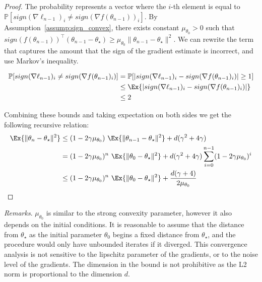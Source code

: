 \documentclass[12pt]{article}
\begin{document}
\begin{proof}
The probability represents a vector where the $i$-th element is equal to $\mathbb{P} [ sign( \nabla \ell_{n-1} )_i \neq sign( \nabla f ( \theta_{n-1} ) )_i ]$.
By Assumption~\ref{assump:sign_convex}, there exists constant $\mu_{\theta_0} > 0$ such that $sign( f ( \theta_{n-1} ) )^\top ( \theta_{n-1} - \theta_\star ) \geq \mu_{\theta_0} \| \theta_{n-1} - \theta_\star \|^2 $.
We can rewrite the term that captures the amount that the sign of the gradient estimate is incorrect, and use Markov's inequality.

\begin{align*}
\mathbb{P} [ sign( \nabla \ell_{n-1} )_i \neq sign( \nabla f ( \theta_{n-1} )_i ) ] &= \mathbb{P} [ | sign( \nabla \ell_{n-1} )_i - sign( \nabla f ( \theta_{n-1} )_i ) | \geq 1 ] \\
&\leq \Ex{ | sign( \nabla \ell_{n-1} )_i - sign( \nabla f ( \theta_{n-1} )_i ) | } \\
&\leq 2
\end{align*}

Combining these bounds and taking expectation on both sides we get the following recursive relation:
\begin{align*}
\Ex{ \| \theta_n - \theta_\star \|^2 } &\leq ( 1 - 2 \gamma \mu_{\theta_0} ) \ \Ex{ \| \theta_{n-1} - \theta_\star \|^2 } + d (\gamma^2 + 4 \gamma) \\
&= ( 1 - 2 \gamma \mu_{\theta_0} )^n \ \Ex{ \| \theta_{0} - \theta_\star \|^2 } + d (\gamma^2 + 4 \gamma) \sum_{i=0}^{n-1} ( 1 - 2 \gamma \mu_{\theta_0} )^i \\
&\leq ( 1 - 2 \gamma \mu_{\theta_0} )^n \ \Ex{ \| \theta_{0} - \theta_\star \|^2 } + \frac{d ( \gamma + 4)}{2 \mu_{\theta_0}}
\end{align*}
\end{proof}

\emph{Remarks}.
$\mu_{\theta_0}$ is similar to the strong convexity parameter, however it also depends on the initial conditions.
It is reasonable to assume that the distance from $\theta_\star$ as the initial parameter $\theta_0$ begins a fixed distance from $\theta_\star$, and the procedure would only have unbounded iterates if it diverged.
This convergence analysis is not sensitive to the lipschitz parameter of the gradients, or to the noise level of the gradients.
The dimension in the bound is not prohibitive as the L2 norm is proportional to the dimension $d$.
\end{document}
